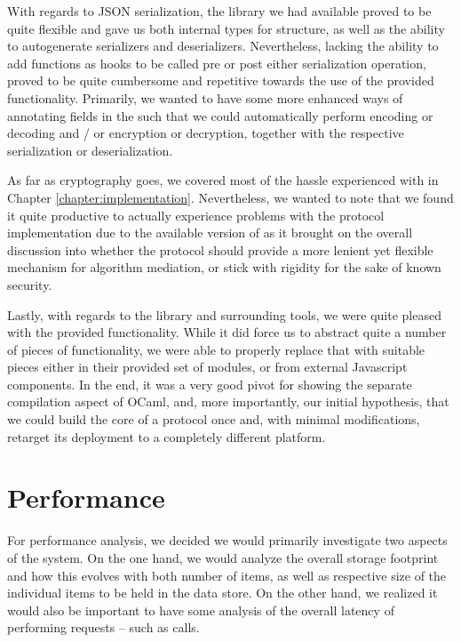 With regards to JSON serialization, the library we had available proved to be quite flexible and gave us both internal types for structure, as well as the ability to autogenerate serializers and deserializers.
Nevertheless, lacking the ability to add functions as hooks to be called pre or post either serialization operation, proved to be quite cumbersome and repetitive towards the use of the provided functionality.
Primarily, we wanted to have some more enhanced ways of annotating fields in the  such that we could automatically perform encoding or decoding and / or encryption or decryption, together with the respective serialization or deserialization.

As far as cryptography goes, we covered most of the hassle experienced with  in Chapter \ref{chapter:implementation}.
Nevertheless, we wanted to note that we found it quite productive to actually experience problems with the protocol implementation due to the available version of  as it brought on the overall discussion into whether the protocol should provide a more lenient yet flexible mechanism for algorithm mediation, or stick with rigidity for the sake of known security.

Lastly, with regards to the  library and surrounding tools, we were quite pleased with the provided functionality.
While it did force us to abstract quite a number of pieces of functionality, we were able to properly replace that with suitable pieces either in their provided set of modules, or from external Javascript components.
In the end, it was a very good pivot for showing the separate compilation aspect of OCaml, and, more importantly, our initial hypothesis, that we could build the core of a protocol once and, with minimal modifications, retarget its deployment to a completely different platform.

\section{Performance}
For performance analysis, we decided we would primarily investigate two aspects of the system.
On the one hand, we would analyze the overall storage footprint and how this evolves with both number of items, as well as respective size of the individual items to be held in the data store.
On the other hand, we realized it would also be important to have some analysis of the overall latency of performing requests -- such as  calls.

